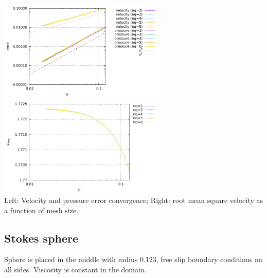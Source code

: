 \begin{center}
\includegraphics[width=8cm]{python_codes/fieldstone_80/results/db2d/errors}
\includegraphics[width=8cm]{python_codes/fieldstone_80/results/db2d/vrms}\\
{\captionfont Left: Velocity and pressure error convergence; Right: root mean square velocity
as a function of mesh size.}
\end{center}


\subsection*{Stokes sphere}

Sphere is placed in the middle with radius 0.123, free slip boundary conditions on all sides. 
Viscosity is constant in the domain. 

